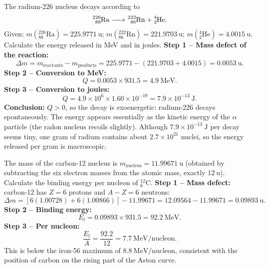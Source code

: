 \documentclass[11pt]{article}
\begin{document}
\begin{exoresolu}
The radium-226 nucleus decays according to
\[
\ce{^{226}_{88}Ra -> ^{222}_{86}Rn + ^{4}_{2}He}.
\]
Given: $m(\ensuremath{\mathrm{^{226}_{88}Ra}}) = 225.9771\ \mathrm{u}$; $m(\ensuremath{\mathrm{^{222}_{86}Rn}}) = 221.9703\ \mathrm{u}$; $m(\ensuremath{\mathrm{^{4}_{2}He}}) = 4.0015\ \mathrm{u}$. Calculate the energy released in MeV and in joules.
\tcblower
\textbf{Step 1 -- Mass defect of the reaction:}
\[
\Delta m = m_{\text{reactants}} - m_{\text{products}} = 225.9771 - (221.9703 + 4.0015) = 0.0053\ \mathrm{u}.
\]
\textbf{Step 2 -- Conversion to MeV:}
\[
Q = 0.0053 \times 931.5 = 4.9\ \mathrm{MeV}.
\]
\textbf{Step 3 -- Conversion to joules:}
\[
Q = 4.9\times 10^{6} \times 1.60\times 10^{-19} = 7.9\times 10^{-13}\ \mathrm{J}.
\]
\textbf{Conclusion:} $Q > 0$, so the decay is exoenergetic: radium-226 decays spontaneously. The energy appears essentially as the kinetic energy of the $\alpha$ particle (the radon nucleus recoils slightly). Although $7.9\times 10^{-13}\ \mathrm{J}$ per decay seems tiny, one gram of radium contains about $2.7\times 10^{21}$ nuclei, so the energy released per gram is macroscopic.
\end{exoresolu}

\begin{exoresolu}
The mass of the carbon-12 nucleus is $m_{\mathrm{nucleus}} = 11.99671\ \mathrm{u}$ (obtained by subtracting the six electron masses from the atomic mass, exactly $12\ \mathrm{u}$). Calculate the binding energy per nucleon of \ensuremath{\mathrm{^{12}_{6}C}}.
\tcblower
\textbf{Step 1 -- Mass defect:} carbon-12 has $Z = 6$ protons and $A - Z = 6$ neutrons:
\[
\Delta m = \left[6(1.00728) + 6(1.00866)\right] - 11.99671 = 12.09564 - 11.99671 = 0.09893\ \mathrm{u}.
\]
\textbf{Step 2 -- Binding energy:}
\[
E_l = 0.09893 \times 931.5 = 92.2\ \mathrm{MeV}.
\]
\textbf{Step 3 -- Per nucleon:}
\[
\frac{E_l}{A} = \frac{92.2}{12} = 7.7\ \mathrm{MeV/nucleon}.
\]
This is below the iron-56 maximum of $8.8\ \mathrm{MeV/nucleon}$, consistent with the position of carbon on the rising part of the Aston curve.
\end{exoresolu}
\end{document}
